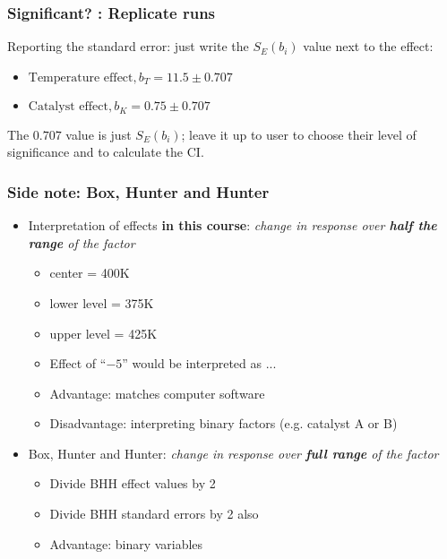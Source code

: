 \begin{frame}\frametitle{Significant? : Replicate runs}

	Reporting the standard error: just write the $S_E(b_i)$ value next to the effect:
	\begin{itemize}
		\item	$\text{Temperature effect}, b_T = 11.5 \pm 0.707$
		\item	$\text{Catalyst effect}, b_K = 0.75 \pm 0.707$
	\end{itemize}

	The $0.707$ value is just $S_E(b_i)$; leave it up to user to choose their level of significance and to calculate the CI.
\end{frame}

\begin{frame}\frametitle{Side note: Box, Hunter and Hunter}
	\begin{itemize}
		\item	Interpretation of effects \textbf{in this course}: \emph{change in response over \textbf{half the range} of the factor}
		\begin{itemize}
			\item	center = 400K
			\item	lower level = 375K
			\item	upper level = 425K
			\item	Effect of ``$-5$'' would be interpreted as ...
			\item	Advantage: matches computer software
			\item	Disadvantage: interpreting binary factors (e.g. catalyst A or B)
		\end{itemize}
	\end{itemize}
	\begin{itemize}
		\item	Box, Hunter and Hunter: \emph{change in response over \textbf{full range} of the factor}
		\begin{itemize}
			\item	Divide BHH effect values by 2
			\item	Divide BHH standard errors by 2 also
			\item	Advantage: binary variables
		\end{itemize}
	\end{itemize}
\end{frame}


